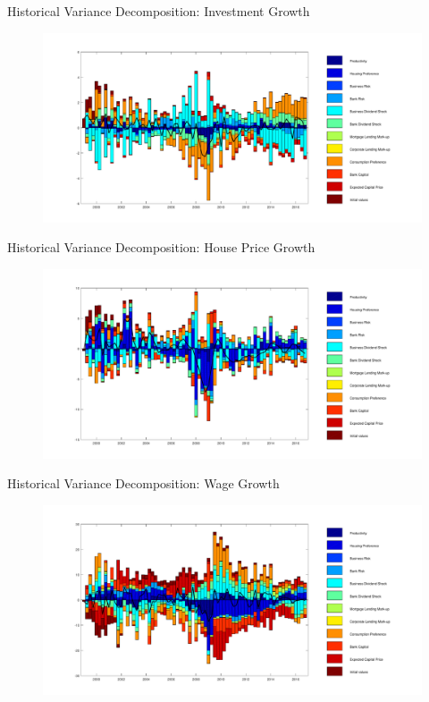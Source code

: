 \documentclass[8pt,aspectratio=169]{beamer}
\numberwithin{equation}{section}
\begin{document}
\begin{frame}{Historical Variance Decomposition: Investment Growth }

\begin{figure}
\includegraphics[scale=0.36]{decomp_dinve.pdf}
\end{figure}
\end{frame}



\begin{frame}{Historical Variance Decomposition: House Price Growth }

\begin{figure}
\includegraphics[scale=0.36]{decomp_dqh.pdf}
\end{figure}
\end{frame}


\begin{frame}{Historical Variance Decomposition: Wage Growth }

\begin{figure}
\includegraphics[scale=0.36]{decomp_dw.pdf}
\end{figure}
\end{frame}
\end{document}
